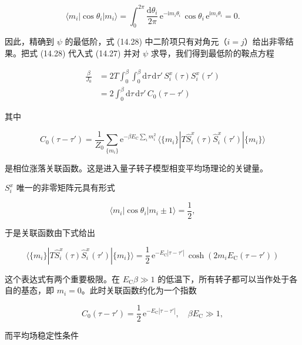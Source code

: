 \begin{equation*}
\langle m_i|\cos\theta_i|m_i\rangle = \int_0^{2\pi} \frac{\mathrm{d}\theta_i}{2\pi}\, \mathrm{e}^{-\mathrm{i}m_i\theta_i}\, \cos\theta_i\, \mathrm{e}^{\mathrm{i}m_i\theta_i} = 0.\tag{14.32}
\end{equation*}

因此，精确到 $\psi$ 的最低阶，式 (14.28) 中二阶项只有对角元（$i=j$）给出非零结果。把式 (14.28) 代入式 (14.27) 并对 $\psi$ 求导，我们得到最低阶的鞍点方程

\begin{align*}
\frac{\beta}{J_0} &= 2\left. T \int_0^{\beta}\int_0^{\beta} \mathrm{d}\tau\,\mathrm{d}\tau'\, S_i^x(\tau) S_i^x(\tau') \right. \\
&= 2\int_0^{\beta} \mathrm{d}\tau\,\mathrm{d}\tau'\, C_0(\tau-\tau')\tag{14.33}
\end{align*}

其中

\begin{equation*}
C_0(\tau-\tau') = \frac{1}{Z_0} \sum_{\{m_i\}} \mathrm{e}^{-\beta E_{\mathrm{C}} \sum_i m_i^2}\, \langle\{m_i\}| T \hat{S}_i^x(\tau) \hat{S}_i^x(\tau') |\{m_i\}\rangle\tag{14.34}
\end{equation*}

是相位涨落关联函数。这是进入量子转子模型相变平均场理论的关键量。

$S_i^x$ 唯一的非零矩阵元具有形式

\begin{equation*}
\langle m_i|\cos\theta_i|m_i\pm 1\rangle = \frac{1}{2},\tag{14.35}
\end{equation*}

于是关联函数由下式给出

\begin{equation*}
\langle\{m_i\}| T \hat{S}_i^x(\tau) \hat{S}_i^x(\tau') |\{m_i\}\rangle = \frac{1}{2}\, \mathrm{e}^{-E_{\mathrm{C}}|\tau-\tau'|}\, \cosh(2m_i E_{\mathrm{C}}(\tau-\tau'))\tag{14.36}
\end{equation*}

这个表达式有两个重要极限。在 $E_{\mathrm{C}}\beta\gg 1$ 的低温下，所有转子都可以当作处于各自的基态，即 $m_i=0$。此时关联函数约化为一个指数

\begin{equation*}
C_0(\tau-\tau') = \frac{1}{2}\, \mathrm{e}^{-E_{\mathrm{C}}|\tau-\tau'|}, \quad \beta E_{\mathrm{C}}\gg 1,\tag{14.37}
\end{equation*}

而平均场稳定性条件

